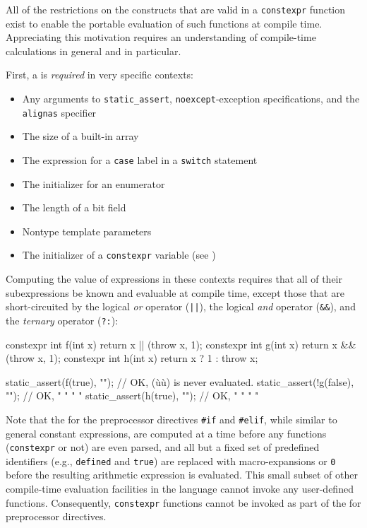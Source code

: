 All of the restrictions on the constructs that are valid in a
\lstinline!constexpr! function exist to enable the portable evaluation of
such functions at compile time. Appreciating this motivation requires an
understanding of compile-time calculations in general and
 in particular.

First, a  is \emph{required} in very
specific contexts:

\begin{itemize}
\item{Any arguments to \lstinline!static_assert!, \lstinline!noexcept!-exception specifications, and the \lstinline!alignas! specifier}
\item{The size of a built-in array}
\item{The expression for a \lstinline!case! label in a \lstinline!switch! statement}
\item{The initializer for an enumerator}
\item{The length of a bit field}
\item{Nontype template parameters}
\item{The initializer of a \lstinline!constexpr! variable (see )}
\end{itemize}

Computing the value of expressions in these contexts requires that all
of their subexpressions be known and evaluable at compile time, except
those that are short-circuited by the logical \emph{or} operator
(\lstinline!||!), the logical \emph{and} operator (\lstinline!&&!), and the
\emph{ternary} operator (\lstinline!?:!):

\begin{emcppslisting}
constexpr int f(int x) { return x || (throw x, 1); }
constexpr int g(int x) { return x && (throw x, 1); }
constexpr int h(int x) { return x ? 1 : throw x; }

static_assert(f(true), "");    // OK, (ù{}ù) is never evaluated.
static_assert(!g(false), "");  // OK,     "     "    "      "
static_assert(h(true), "");    // OK,     "     "    "      "
\end{emcppslisting}


\noindent Note that the  for the
preprocessor directives \lstinline!#if! and \lstinline!#elif!, while similar
to general constant expressions, are computed at a time before any
functions (\lstinline!constexpr! or not) are even parsed, and all but a
fixed set of predefined identifiers (e.g., \lstinline!defined! and
\lstinline!true!) are replaced with macro-expansions or \lstinline!0! before
the resulting arithmetic expression is evaluated. This small subset of
other compile-time evaluation facilities in the language cannot invoke
any user-defined functions. Consequently, \lstinline!constexpr! functions
cannot be invoked as part of the  for preprocessor directives.

